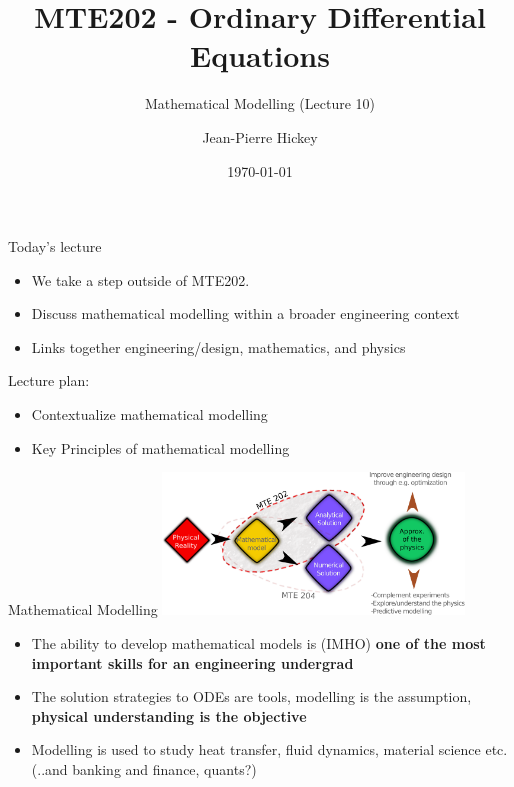 \documentclass{beamer}
\title{MTE202 - Ordinary Differential Equations}
\subtitle{Mathematical Modelling  (Lecture 10)}
\author{Jean-Pierre Hickey}
\institute{Mechanical and Mechatronics Engineering}
\date{\today}
\begin{document}
{
\maketitle
}


\begin{frame}{Today's lecture}
\begin{itemize}
\item We take a step outside of MTE202.
\item Discuss mathematical modelling within a broader engineering context
\item Links together engineering/design, mathematics, and physics
\end{itemize}

\vspace{0.5cm}
Lecture plan:
\begin{itemize}
\item Contextualize mathematical modelling
\item Key Principles of mathematical modelling
\end{itemize}
\end{frame}





\begin{frame}{Mathematical Modelling}
\centering
\includegraphics[width=0.6\textwidth]{../figs/ConceptMap.pdf} 
\begin{itemize}
\item The ability to develop mathematical models is (IMHO)  \textbf{one of the most important skills for an engineering undergrad}
\item The solution strategies to ODEs are tools, modelling is the assumption, \textbf{physical understanding is the objective}
\item Modelling is used to study heat transfer, fluid dynamics, material science etc. (..and banking and finance, quants?)
\end{itemize}
\end{frame}
\end{document}
